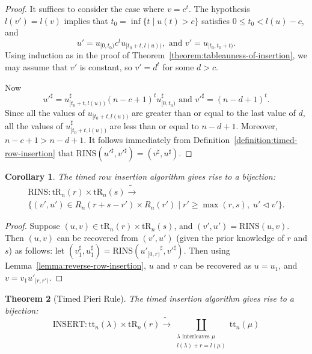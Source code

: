 \documentclass[10pt]{amsproc}
\newtheorem{theorem}{Theorem}[subsection]
\newtheorem{corollary}[theorem]{Corollary}
\theoremstyle{definition}
\theoremstyle{remark}
\newcommand{\rowins}{\mathrm{RINS}}
\newcommand{\ins}{\mathrm{INSERT}}
\newcommand{\ttab}{\mathrm{tt}}
\newcommand{\tr}{\mathrm{tR}}
\begin{document}
\begin{proof}
  It suffices to consider the case where $v=c^t$.
  The hypothesis $l(v')=l(v)$ implies that $t_0=\inf\{t\mid u(t)>c\}$ satisfies $0\leq t_0<l(u)-c$, and
  \begin{displaymath}
    u'=u_{[0,t_0)}c^tu_{[t_0+t,l(u))}, \text{ and } v'=u_{[t_0,t_0+t)}.
  \end{displaymath}
  Using induction as in the proof of Theorem~\ref{theorem:tableauness-of-insertion}, we may assume that $v'$ is constant, so $v'=d^t$ for some $d>c$.

  Now
  \begin{displaymath}
    {u'}^\sharp=u_{[t_0+t,l(u))}^\sharp (n-c+1)^t u_{[0,t_0)}^\sharp \text{ and } {v'}^\sharp=(n-d+1)^t.
  \end{displaymath}
  Since all the values of $u_{[t_0+t,l(u))}$ are greater than or equal to the last value of $d$, all the values of $u_{[t_0+t,l(u))}^\sharp$ are less than or equal to $n-d+1$.
  Moreover, $n-c+1>n-d+1$.
  It follows immediately from Definition~\ref{definition:timed-row-insertion} that $\rowins({u'}^\sharp,{v'}^\sharp)=(v^\sharp,u^\sharp)$.
\end{proof}
\begin{corollary}
  \label{corollary:row-insertion-bijection}
  The timed row insertion algorithm gives rise to a bijection:
  \begin{multline*}
    \rowins: \tr_n(r)\times \tr_n(s) \tilde\to \\\{(v',u')\in R_n(r+s-r')\times R_n(r')\mid r'\geq \max(r,s),\; u'\lhd v'\}. 
  \end{multline*}
\end{corollary}
\begin{proof}
  Suppose $(u,v)\in \tr_n(r)\times \tr_n(s)$, and $(v',u')=\rowins(u,v)$.
  Then $(u,v)$ can be recovered from $(v',u')$ (given the prior knowledge of $r$ and $s$) as follows:
  let $(v_1^\sharp, u_1^\sharp)=\rowins({u'_{[0,r)}}^\sharp, {v'}^\sharp)$.
  Then using Lemma~\ref{lemma:reverse-row-insertion}, $u$ and $v$ can be recovered as $u=u_1$, and $v=v_1u'_{[r,r')}$.
\end{proof}
\begin{theorem}[Timed Pieri Rule]
  \label{theorem:pieri}
  The timed insertion algorithm gives rise to a bijection:
  \begin{displaymath}
    \ins: \ttab_n(\lambda)\times \tr_n(r) \tilde\to \coprod_{\begin{smallmatrix}\text{$\lambda$ interleaves $\mu$}\\{l(\lambda)+r = l(\mu)}\end{smallmatrix}} \ttab_n(\mu)
  \end{displaymath}
\end{theorem}
\end{document}
